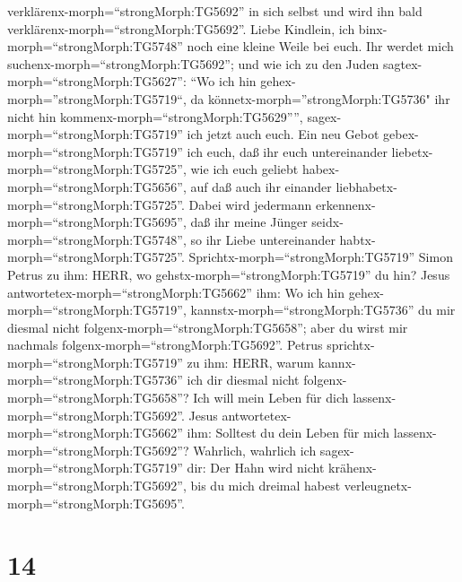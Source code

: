 verklärenx-morph=``strongMorph:TG5692'' in sich selbst und wird ihn bald
verklärenx-morph=``strongMorph:TG5692''.  Liebe Kindlein,
ich binx-morph=``strongMorph:TG5748'' noch eine kleine Weile bei euch.
Ihr werdet mich suchenx-morph=``strongMorph:TG5692''; und wie ich zu den
Juden sagtex-morph=``strongMorph:TG5627'': ``Wo ich hin
gehex-morph=''strongMorph:TG5719``, da
könnetx-morph=''strongMorph:TG5736" ihr nicht hin
kommenx-morph=``strongMorph:TG5629'''',
sagex-morph=``strongMorph:TG5719'' ich jetzt auch euch. 
Ein neu Gebot gebex-morph=``strongMorph:TG5719'' ich euch, daß ihr euch
untereinander liebetx-morph=``strongMorph:TG5725'', wie ich euch geliebt
habex-morph=``strongMorph:TG5656'', auf daß auch ihr einander
liebhabetx-morph=``strongMorph:TG5725''.  Dabei wird
jedermann erkennenx-morph=``strongMorph:TG5695'', daß ihr meine Jünger
seidx-morph=``strongMorph:TG5748'', so ihr Liebe untereinander
habtx-morph=``strongMorph:TG5725''. 
Sprichtx-morph=``strongMorph:TG5719'' Simon Petrus zu ihm: HERR, wo
gehstx-morph=``strongMorph:TG5719'' du hin? Jesus
antwortetex-morph=``strongMorph:TG5662'' ihm: Wo ich hin
gehex-morph=``strongMorph:TG5719'', kannstx-morph=``strongMorph:TG5736''
du mir diesmal nicht folgenx-morph=``strongMorph:TG5658''; aber du wirst
mir nachmals folgenx-morph=``strongMorph:TG5692''.  Petrus
sprichtx-morph=``strongMorph:TG5719'' zu ihm: HERR, warum
kannx-morph=``strongMorph:TG5736'' ich dir diesmal nicht
folgenx-morph=``strongMorph:TG5658''? Ich will mein Leben für dich
lassenx-morph=``strongMorph:TG5692''.  Jesus
antwortetex-morph=``strongMorph:TG5662'' ihm: Solltest du dein Leben für
mich lassenx-morph=``strongMorph:TG5692''? Wahrlich, wahrlich ich
sagex-morph=``strongMorph:TG5719'' dir: Der Hahn wird nicht
krähenx-morph=``strongMorph:TG5692'', bis du mich dreimal habest
verleugnetx-morph=``strongMorph:TG5695''.

\hypertarget{section-13}{%
\section{14}\label{section-13}}

